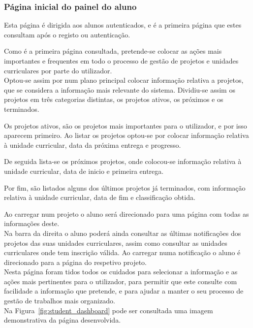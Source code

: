 \subsubsection{Página inicial do painel do aluno}
\label{ssub:student_dashboard}

Esta página é dirigida aos alunos autenticados, e é a primeira página que estes consultam após o registo ou autenticação.

Como é a primeira página consultada, pretende-se colocar as ações mais importantes e frequentes em todo o processo de gestão de projetos e unidades curriculares por parte do utilizador.\\

Optou-se assim por num plano principal colocar informação relativa a projetos, que se considera a informação mais relevante do sistema. Dividiu-se assim os projetos em três categorias distintas, os projetos ativos, os próximos e os terminados.

Os projetos ativos, são os projetos mais importantes para o utilizador, e por isso aparecem primeiro. Ao listar os projetos optou-se por colocar informação relativa à unidade curricular, data da próxima entrega e progresso.

De seguida lista-se os próximos projetos, onde colocou-se informação relativa à unidade curricular, data de inicio e primeira entrega.

Por fim, são listados alguns dos últimos projetos já terminados, com informação relativa à unidade curricular, data de fim e classificação obtida.

Ao carregar num projeto o aluno será direcionado para uma página com todas as informações deste.\\

Na barra da direita o aluno poderá ainda consultar as últimas notificações dos projetos das suas unidades curriculares, assim como consultar as unidades curriculares onde tem inscrição válida.
Ao carregar numa notificação o aluno é direcionado para a página do respetivo projeto.\\

Nesta página foram tidos todos os cuidados para selecionar a informação e as ações mais pertinentes para o utilizador, para permitir que este consulte com facilidade a informação que pretende, e para ajudar a manter o seu processo de gestão de trabalhos mais organizado.\\

Na Figura~\ref{fig:student_dashboard} pode ser consultada uma imagem demonstrativa da página desenvolvida.

